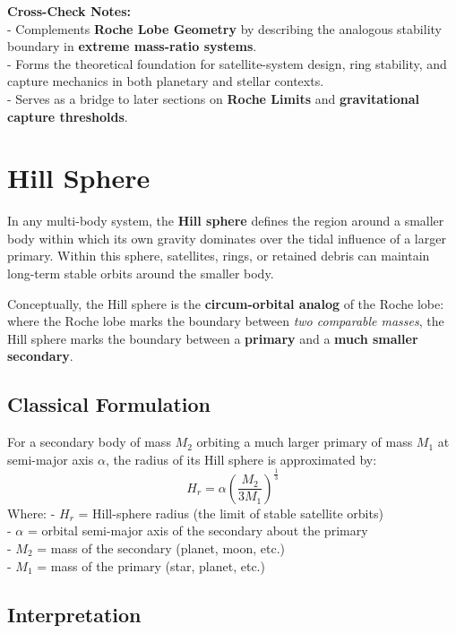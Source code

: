 \documentclass[
  letterpaper,
]{book}
\begin{document}
\textbf{Cross-Check Notes:}\\
- Complements \textbf{Roche Lobe Geometry} by describing the analogous
stability boundary in \textbf{extreme mass-ratio systems}.\\
- Forms the theoretical foundation for satellite-system design, ring
stability, and capture mechanics in both planetary and stellar
contexts.\\
- Serves as a bridge to later sections on \textbf{Roche Limits} and
\textbf{gravitational capture thresholds}.

\section{Hill Sphere}\label{hill-sphere}

In any multi-body system, the \textbf{Hill sphere} defines the region
around a smaller body within which its own gravity dominates over the
tidal influence of a larger primary. Within this sphere, satellites,
rings, or retained debris can maintain long-term stable orbits around
the smaller body.

Conceptually, the Hill sphere is the \textbf{circum-orbital analog} of
the Roche lobe: where the Roche lobe marks the boundary between
\emph{two comparable masses}, the Hill sphere marks the boundary between
a \textbf{primary} and a \textbf{much smaller secondary}.

\subsection{Classical Formulation}\label{classical-formulation}

For a secondary body of mass \(M_2\) orbiting a much larger primary of
mass \(M_1\) at semi-major axis \(\alpha\), the radius of its Hill
sphere is approximated by: \[
H_r = \alpha
       \left(
         \frac{M_2}{3M_1}
       \right)^{\!\tfrac{1}{3}}
\] Where: - \(H_r\) = Hill-sphere radius (the limit of stable satellite
orbits)\\
- \(\alpha\) = orbital semi-major axis of the secondary about the
primary\\
- \(M_2\) = mass of the secondary (planet, moon, etc.)\\
- \(M_1\) = mass of the primary (star, planet, etc.)

\subsection{Interpretation}\label{interpretation-1}
\end{document}
